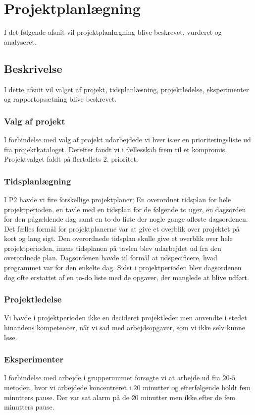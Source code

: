 \chapter{Projektplanlægning}
I det følgende afsnit vil projektplanlægning blive beskrevet, vurderet og analyseret. 

\section{Beskrivelse}
I dette afsnit vil valget af projekt, tidsplanlæsning, projektledelse, eksperimenter og rapportopsætning blive beskrevet.

\subsection{Valg af projekt}
I forbindelse med valg af projekt udarbejdede vi hver især en prioriteringsliste ud fra projektkataloget. Derefter fandt vi i fællesskab frem til et kompromis. Projektvalget faldt på flertallets $2$. prioritet.

\subsection{Tidsplanlægning}
I P$2$ havde vi fire forskellige projektplaner; En overordnet tidsplan for hele projektperioden, en tavle med en tidsplan for de følgende to uger, en dagsorden for den pågældende dag samt en to-do liste der nogle gange afløste dagsordenen. 
Det fælles formål for projektplanerne var at give et overblik over projektet på kort og lang sigt.
Den overordnede tidsplan skulle give et overblik over hele projektperioden, imens tidsplanen på tavlen blev udarbejdet ud fra den overordnede plan. Dagsordenen havde til formål at udspecificere, hvad programmet var for den enkelte dag. Sidst i projektperioden blev dagsordenen dog ofte erstattet af en to-do liste med de opgaver, der manglede at blive udført.

\subsection{Projektledelse}
Vi havde i projektperioden ikke en decideret projektleder men anvendte i stedet hinandens kompetencer, når vi sad med arbejdsopgaver, som vi ikke selv kunne løse.

\subsection{Eksperimenter}
I forbindelse med arbejde i grupperummet forsøgte vi at arbejde ud fra $20$-$5$ metoden, hvor vi arbejdede koncentreret i $20$ minutter og efterfølgende holdt fem minutters pause. Der var sat alarm på de $20$ minutter men ikke efter de fem minutters pause. 

